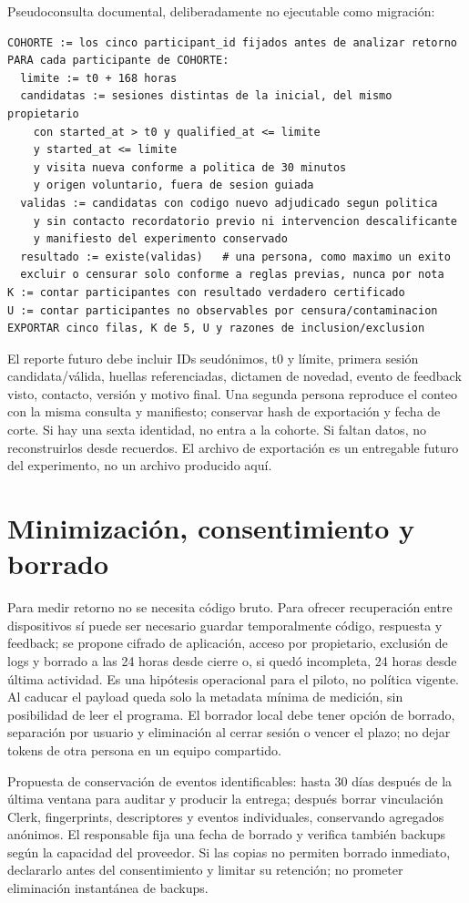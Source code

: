 \documentclass[11pt,a4paper]{report}
\begin{document}
Pseudoconsulta documental, deliberadamente no ejecutable como migración:
\begin{verbatim}
COHORTE := los cinco participant_id fijados antes de analizar retorno
PARA cada participante de COHORTE:
  limite := t0 + 168 horas
  candidatas := sesiones distintas de la inicial, del mismo propietario
    con started_at > t0 y qualified_at <= limite
    y started_at <= limite
    y visita nueva conforme a politica de 30 minutos
    y origen voluntario, fuera de sesion guiada
  validas := candidatas con codigo nuevo adjudicado segun politica
    y sin contacto recordatorio previo ni intervencion descalificante
    y manifiesto del experimento conservado
  resultado := existe(validas)   # una persona, como maximo un exito
  excluir o censurar solo conforme a reglas previas, nunca por nota
K := contar participantes con resultado verdadero certificado
U := contar participantes no observables por censura/contaminacion
EXPORTAR cinco filas, K de 5, U y razones de inclusion/exclusion
\end{verbatim}
El reporte futuro debe incluir IDs seudónimos, t0 y límite, primera sesión candidata/válida, huellas referenciadas, dictamen de novedad, evento de feedback visto, contacto, versión y motivo final. Una segunda persona reproduce el conteo con la misma consulta y manifiesto; conservar hash de exportación y fecha de corte. Si hay una sexta identidad, no entra a la cohorte. Si faltan datos, no reconstruirlos desde recuerdos. El archivo de exportación es un entregable futuro del experimento, no un archivo producido aquí.

\section{Minimización, consentimiento y borrado}
Para medir retorno no se necesita código bruto. Para ofrecer recuperación entre dispositivos sí puede ser necesario guardar temporalmente código, respuesta y feedback; se propone cifrado de aplicación, acceso por propietario, exclusión de logs y borrado a las 24 horas desde cierre o, si quedó incompleta, 24 horas desde última actividad. Es una hipótesis operacional para el piloto, no política vigente. Al caducar el payload queda solo la metadata mínima de medición, sin posibilidad de leer el programa. El borrador local debe tener opción de borrado, separación por usuario y eliminación al cerrar sesión o vencer el plazo; no dejar tokens de otra persona en un equipo compartido.

Propuesta de conservación de eventos identificables: hasta 30 días después de la última ventana para auditar y producir la entrega; después borrar vinculación Clerk, fingerprints, descriptores y eventos individuales, conservando agregados anónimos. El responsable fija una fecha de borrado y verifica también backups según la capacidad del proveedor. Si las copias no permiten borrado inmediato, declararlo antes del consentimiento y limitar su retención; no prometer eliminación instantánea de backups.
\end{document}
